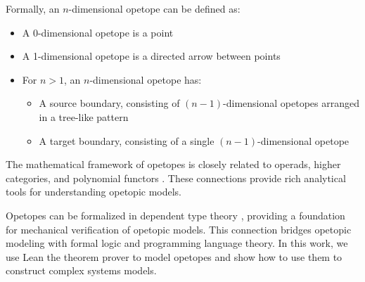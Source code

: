 Formally, an $n$-dimensional opetope can be defined as:

\begin{itemize}
    \item A 0-dimensional opetope is a point
    \item A 1-dimensional opetope is a directed arrow between points
    \item For $n>1$, an $n$-dimensional opetope has:
    \begin{itemize}
        \item A source boundary, consisting of $(n-1)$-dimensional opetopes arranged in a tree-like pattern
        \item A target boundary, consisting of a single $(n-1)$-dimensional opetope
    \end{itemize}
\end{itemize}

The mathematical framework of opetopes is closely related to operads, higher categories, and polynomial functors \citep{baez2020network, leinster2004higher}. These connections provide rich analytical tools for understanding opetopic models.

Opetopes can be formalized in dependent type theory \citep{finster2019opetopic}, providing a foundation for mechanical verification of opetopic models. This connection bridges opetopic modeling with formal logic and programming language theory. In this work, we use Lean the theorem prover to model opetopes and show how to use them to construct complex systems models.
